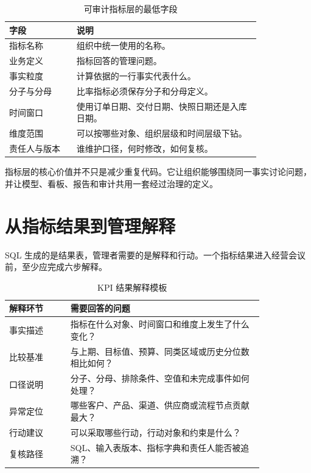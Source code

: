 \documentclass[UTF8,fontset=fandol,openany,zihao=-4]{ctexbook}
\begin{document}
\begin{table}[htbp]
\centering
\caption{可审计指标层的最低字段}
\begin{tabular}{p{0.22\linewidth}p{0.60\linewidth}}
\toprule
字段 & 说明\\
\midrule
指标名称 & 组织中统一使用的名称。\\
业务定义 & 指标回答的管理问题。\\
事实粒度 & 计算依据的一行事实代表什么。\\
分子与分母 & 比率指标必须保存分子和分母定义。\\
时间窗口 & 使用订单日期、交付日期、快照日期还是入库日期。\\
维度范围 & 可以按哪些对象、组织层级和时间层级下钻。\\
责任人与版本 & 谁维护口径，何时修改，如何复核。\\
\bottomrule
\end{tabular}
\end{table}

指标层的核心价值并不只是减少重复代码。它让组织能够围绕同一事实讨论问题，并让模型、看板、报告和审计共用一套经过治理的定义。

\section{从指标结果到管理解释}

SQL 生成的是结果表，管理者需要的是解释和行动。一个指标结果进入经营会议前，至少应完成六步解释。

\begin{table}[htbp]
\centering
\caption{KPI 结果解释模板}
\begin{tabular}{p{0.20\linewidth}p{0.63\linewidth}}
\toprule
解释环节 & 需要回答的问题\\
\midrule
事实描述 & 指标在什么对象、时间窗口和维度上发生了什么变化？\\
比较基准 & 与上期、目标值、预算、同类区域或历史分位数相比如何？\\
口径说明 & 分子、分母、排除条件、空值和未完成事件如何处理？\\
异常定位 & 哪些客户、产品、渠道、供应商或流程节点贡献最大？\\
行动建议 & 可以采取哪些行动，行动对象和约束是什么？\\
复核路径 & SQL、输入表版本、指标字典和责任人能否被追溯？\\
\bottomrule
\end{tabular}
\end{table}
\end{document}
